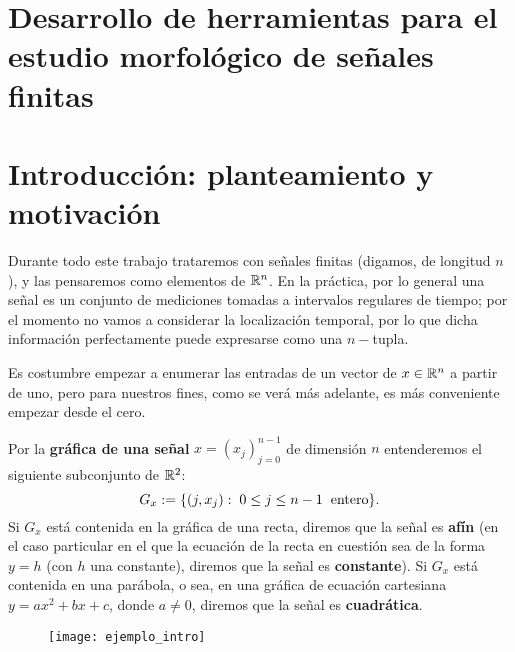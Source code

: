 
\section{Desarrollo de herramientas para el estudio morfológico de señales finitas}
\section{Introducción: planteamiento y motivación}

Durante todo este trabajo trataremos con señales
finitas
(digamos, de
longitud $n$), y las pensaremos como elementos de $\mathbb{R}^{n}$.
En la práctica, por lo general
una señal es un conjunto de mediciones tomadas
a intervalos regulares de tiempo; por el momento no vamos
a considerar la localización temporal, por lo que dicha
información perfectamente puede expresarse como 
una $n-$tupla.

Es costumbre empezar
a enumerar las entradas de un vector
de $x \in \mathbb{R}^{n}$ a partir de uno, pero
para nuestros fines,
como se verá más adelante, es más 
conveniente empezar desde el cero.


\begin{defi}
Por la \textbf{gráfica de una señal} $x=(x_{j})_{j=0}^{n-1}$
de dimensión $n$ entenderemos
 el siguiente subconjunto de $\mathbb{R}^{2}$:
\[
G_{x} := 
\{ (j, x_{j} ) : \hspace{0.1cm} 0 \leq j \leq n-1
\hspace{0.2cm} \text{entero}\} .
\]
Si $G_{x}$ está contenida en la gráfica de una recta, diremos que la
señal es \textbf{afín}
(en el caso particular en el que
la ecuación de la recta en cuestión sea de la forma $y= h$
(con $h$ una constante),
diremos que la señal es
\textbf{constante}). Si  $G_{x}$ está contenida en 
una parábola, o sea, en una
gráfica de ecuación cartesiana
$y=ax^{2}+ bx +c$, donde $a \neq 0$, diremos 
que la señal es \textbf{cuadrática}.
\end{defi}





\begin{figure}[H]
	\texttt{[image: ejemplo\_intro]} 
 \end{figure}


